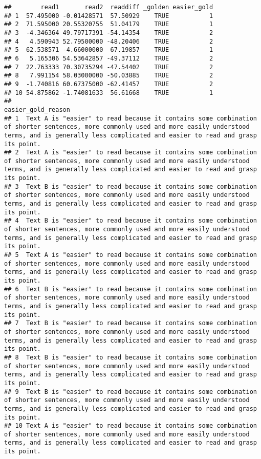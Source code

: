 \documentclass[]{article}
\begin{document}
\begin{verbatim}
##        read1       read2  readdiff _golden easier_gold
## 1  57.495000 -0.01428571  57.50929    TRUE           1
## 2  71.595000 20.55320755  51.04179    TRUE           1
## 3  -4.346364 49.79717391 -54.14354    TRUE           2
## 4   4.590943 52.79500000 -48.20406    TRUE           2
## 5  62.538571 -4.66000000  67.19857    TRUE           1
## 6   5.165306 54.53642857 -49.37112    TRUE           2
## 7  22.763333 70.30735294 -47.54402    TRUE           2
## 8   7.991154 58.03000000 -50.03885    TRUE           2
## 9  -1.740816 60.67375000 -62.41457    TRUE           2
## 10 54.875862 -1.74081633  56.61668    TRUE           1
##                                                                                                                                                                                                      easier_gold_reason
## 1  Text A is "easier" to read because it contains some combination of shorter sentences, more commonly used and more easily understood terms, and is generally less complicated and easier to read and grasp its point.
## 2  Text A is "easier" to read because it contains some combination of shorter sentences, more commonly used and more easily understood terms, and is generally less complicated and easier to read and grasp its point.
## 3  Text B is "easier" to read because it contains some combination of shorter sentences, more commonly used and more easily understood terms, and is generally less complicated and easier to read and grasp its point.
## 4  Text B is "easier" to read because it contains some combination of shorter sentences, more commonly used and more easily understood terms, and is generally less complicated and easier to read and grasp its point.
## 5  Text A is "easier" to read because it contains some combination of shorter sentences, more commonly used and more easily understood terms, and is generally less complicated and easier to read and grasp its point.
## 6  Text B is "easier" to read because it contains some combination of shorter sentences, more commonly used and more easily understood terms, and is generally less complicated and easier to read and grasp its point.
## 7  Text B is "easier" to read because it contains some combination of shorter sentences, more commonly used and more easily understood terms, and is generally less complicated and easier to read and grasp its point.
## 8  Text B is "easier" to read because it contains some combination of shorter sentences, more commonly used and more easily understood terms, and is generally less complicated and easier to read and grasp its point.
## 9  Text B is "easier" to read because it contains some combination of shorter sentences, more commonly used and more easily understood terms, and is generally less complicated and easier to read and grasp its point.
## 10 Text A is "easier" to read because it contains some combination of shorter sentences, more commonly used and more easily understood terms, and is generally less complicated and easier to read and grasp its point.
\end{verbatim}
\end{document}
